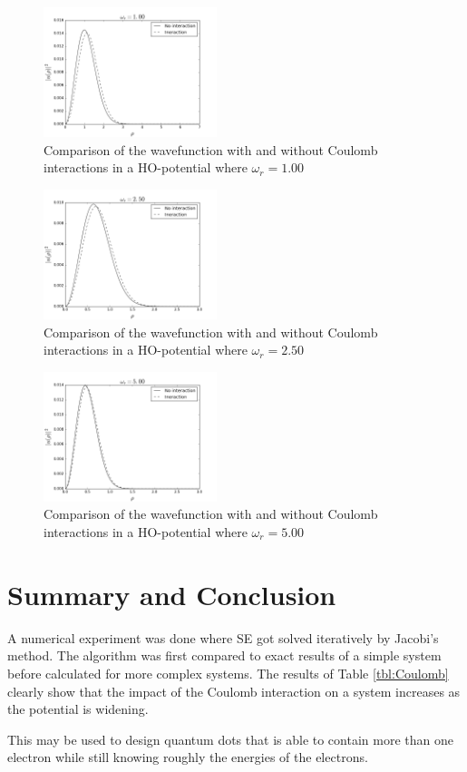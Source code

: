 \documentclass[twoside,twocolumn]{article}
\newcommand{\nl}{
	
	\medskip
	\noindent
}
\begin{document}
	\begin{figure}[p]
		\includegraphics[width=0.45\textwidth]{../report/figures/freq100.png} 
		\caption{Comparison of the wavefunction with and without Coulomb interactions in a HO-potential where $\omega_r=1.00$}\label{fig:fq100}
	\end{figure}
	\begin{figure}[p]
		\includegraphics[width=0.45\textwidth]{../report/figures/freq250.png} 
		\caption{Comparison of the wavefunction with and without Coulomb interactions in a HO-potential where $\omega_r=2.50$}\label{fig:fq250}
	\end{figure}
	\begin{figure}[p]
		\includegraphics[width=0.45\textwidth]{../report/figures/freq500.png} 
		\caption{Comparison of the wavefunction with and without Coulomb interactions in a HO-potential where $\omega_r=5.00$}\label{fig:fq500}
	\end{figure}	%
	\section{Summary and Conclusion}
	A numerical experiment was done where SE got solved iteratively by Jacobi's method. The algorithm was first compared to exact results of a simple system before calculated for more complex systems. The results of Table \ref{tbl:Coulomb} clearly show that the impact of the Coulomb interaction on a system increases as the potential is widening.\nl
	This may be used to design quantum dots that is able to contain more than one electron while still knowing roughly the energies of the electrons. 	%
	
	
	
\end{document}
